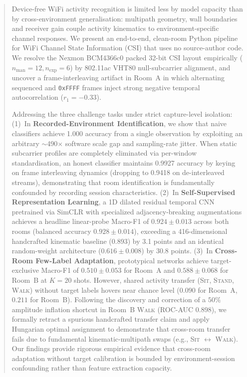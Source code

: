 \documentclass[10pt,a4paper]{article}
\begin{document}
\begin{abstract}
\noindent
Device-free WiFi activity recognition is limited less by model capacity than by cross-environment generalisation: multipath geometry, wall boundaries and receiver gain couple activity kinematics to environment-specific channel responses. We present an end-to-end, clean-room Python pipeline for WiFi Channel State Information (CSI) that uses no source-author code. We resolve the Nexmon BCM4366c0 packed 32-bit CSI layout empirically ($n_{\text{man}}=12, n_{\text{exp}}=6$) by 802.11ac VHT80 null-subcarrier alignment, and uncover a frame-interleaving artifact in Room~A in which alternating sequenced and \texttt{0xFFFF} frames inject strong negative temporal autocorrelation ($r_1 = -0.33$). 

\noindent
Addressing the three challenge tasks under strict capture-level isolation: (1)~In \textbf{Recorded-Environment Identification}, we show that naive classifiers achieve 1.000 accuracy from a single observation by exploiting an arbitrary $\sim$490$\times$ software scale gap and sampling-rate jitter. When static subcarrier profiles are completely eliminated via per-window standardisation, an honest classifier maintains 0.9927 accuracy by keying on frame interleaving dynamics (dropping to 0.9418 on de-interleaved streams), demonstrating that room identification is fundamentally confounded by recording session characteristics. (2)~In \textbf{Self-Supervised Representation Learning}, a 1D dilated residual temporal CNN pretrained via SimCLR with specialized adjacency-breaking augmentations achieves a headline linear-probe Macro-F1 of $\mathbf{0.924 \pm 0.013}$ across both rooms (balanced accuracy $\mathbf{0.928 \pm 0.014}$), exceeding a 416-dimensional handcrafted kinematic baseline (0.893) by 3.1 points and an identical random-weight architecture ($0.616 \pm 0.008$) by 30.8 points. (3)~In \textbf{Cross-Room Few-Label Adaptation}, prototypical networks achieve target-exclusive Macro-F1 of $\mathbf{0.510 \pm 0.053}$ for Room~A and $\mathbf{0.588 \pm 0.068}$ for Room~B at $K=20$ shots. However, shared activity transfer (\textsc{Sit}, \textsc{Stand}, \textsc{Walk}) without target labels hovers near chance level ($0.090$ for Room~A, $0.211$ for Room~B). Following the discovery and correction of a $50\%$ amplitude inflation shortcut in Room~B \textsc{Walk} (ROC-AUC 0.898), we formally retract a spurious handcrafted transfer claim and apply Hungarian optimal assignment to demonstrate that cross-room transfer fails due to fundamental kinematic-multipath swaps (e.g., \textsc{Sit} $\leftrightarrow$ \textsc{Walk}). Our findings provide rigorous empirical evidence that cross-room adaptation without target calibration is bounded by environment-session confounding rather than feature extraction capacity.
\end{abstract}
\end{document}
